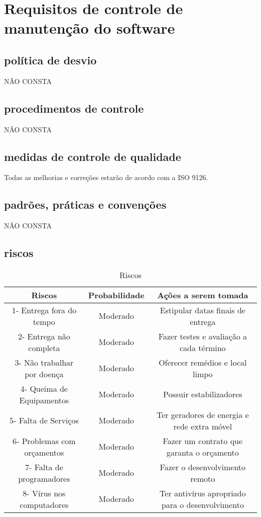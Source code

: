 \chapter{Requisitos de controle de manutenção do software}

\section{política de desvio}
NÃO CONSTA
\section{procedimentos de controle}
NÃO CONSTA
\section{medidas de controle de qualidade}
Todas as melhorias e correções  estarão de acordo com a ISO 9126.
\section{padrões, práticas e convenções}
NÃO CONSTA
\section{riscos}
\begin{table}[!htb]
	\caption[Riscos]{Riscos}
	\label{tab:riscos}
	\centering
	\begin{tabular}{c|c|c}
		Riscos                           &  Probabilidade        &  Ações a serem tomada		\\ \hline
		1- Entrega fora do tempo         &  Moderado             &  Estipular datas finais de entrega 	 \\
	  2- Entrega não completa          & 	Moderado	           &  Fazer testes e avaliação a cada término    \\
    3- Não trabalhar por doença      & 	Moderado	           &  Oferecer remédios e local limpo          	 \\
    4- Queima de Equipamentos		& Moderado		& Possuir estabilizadores 			\\
    5- Falta de Serviços		& Moderado 		& Ter geradores de energia e rede extra móvel \\
    6- Problemas com orçamentos		& Moderado		& Fazer um contrato que garanta o orçamento \\
    7- Falta de programadores		& Moderado		& Fazer o desenvolvimento remoto \\
    8- Vírus nos computadores		& Moderado		& Ter antivírus apropriado para o desenvolvimento \\
	\end{tabular}
\end{table}

